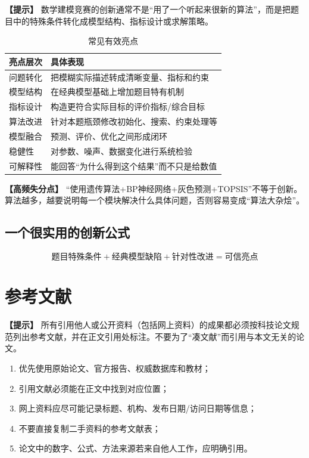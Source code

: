 \documentclass[12pt,a4paper]{article}
\newcommand{\tip}[1]{\par\noindent\textbf{【提示】} #1\par}
\newcommand{\warning}[1]{\par\noindent\textbf{【高频失分点】} #1\par}
\begin{document}
\tip{数学建模竞赛的创新通常不是“用了一个听起来很新的算法”，而是把题目中的特殊条件转化成模型结构、指标设计或求解策略。}

\begin{table}[H]
\centering
\caption{常见有效亮点}
\begin{tabular}{p{3.5cm}p{9cm}}
\toprule
亮点层次 & 具体表现 \\
\midrule
问题转化 & 把模糊实际描述转成清晰变量、指标和约束 \\
模型结构 & 在经典模型基础上增加题目特有机制 \\
指标设计 & 构造更符合实际目标的评价指标/综合目标 \\
算法改进 & 针对本题瓶颈修改初始化、搜索、约束处理等 \\
模型融合 & 预测、评价、优化之间形成闭环 \\
稳健性 & 对参数、噪声、数据变化进行系统检验 \\
可解释性 & 能回答“为什么得到这个结果”而不只是给数值 \\
\bottomrule
\end{tabular}
\end{table}

\warning{“使用遗传算法+BP神经网络+灰色预测+TOPSIS”不等于创新。算法越多，越要说明每一个模块解决什么具体问题，否则容易变成“算法大杂烩”。}

\subsection{一个很实用的创新公式}
\[
\boxed{\text{题目特殊条件}+\text{经典模型缺陷}+\text{针对性改进}=\text{可信亮点}}
\]

\section{参考文献}

\tip{所有引用他人或公开资料（包括网上资料）的成果都必须按科技论文规范列出参考文献，并在正文引用处标注。不要为了“凑文献”而引用与本文无关的论文。}

\begin{enumerate}
  \item 优先使用原始论文、官方报告、权威数据库和教材；
  \item 引用文献必须能在正文中找到对应位置；
  \item 网上资料应尽可能记录标题、机构、发布日期/访问日期等信息；
  \item 不要直接复制二手资料的参考文献表；
  \item 论文中的数字、公式、方法来源若来自他人工作，应明确引用。
\end{enumerate}
\end{document}
